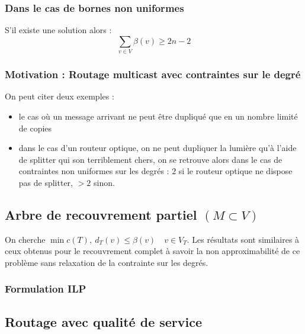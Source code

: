 \documentclass[a4paper,11pt]{thesis}
\begin{document}
\subsubsection{Dans le cas de bornes non uniformes}

\begin{thrm}[Cierlik]
    S'il existe une solution alors :
    \begin{displaymath}
        \sum_{v \in V} \beta(v) \geq 2n - 2
    \end{displaymath}
\end{thrm}

\subsubsection{Motivation : Routage multicast avec contraintes sur le degr\'e}

On peut citer deux exemples :
\begin{itemize}
    \item le cas où un message arrivant ne peut être dupliqué que en un nombre limité de copies
    \item dans le cas d'un routeur optique, on ne peut dupliquer la lumière qu'à l'aide de splitter
        qui son terriblement chers, on se retrouve alors dans le cas de contraintes non uniformes
        sur les degrés : $2$ si le routeur optique ne dispose pas de splitter, $>2$ sinon.
\end{itemize}

\subsection{Arbre de recouvrement partiel $(M \subset V)$}

On cherche $\min c(T),\ d_T(v) \leq \beta(v) \quad v \in V_T$. 
Les résultats sont similaires à ceux obtenus pour le recouvrement complet à savoir la non
approximabilité de ce problème sans relaxation de la contrainte sur les degrés.

\subsubsection{Formulation ILP}


\subsection{Routage avec qualit\'e de service}
\end{document}
